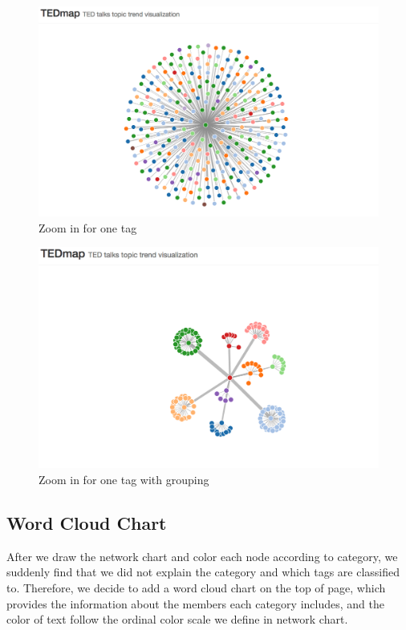 \documentclass{report}
\numberwithin{figure}{section}
\begin{document}
\begin{figure}
\begin{center}
\includegraphics[scale=0.3]{focusOneTag_d1}
\caption{Zoom in for one tag}
\label{fig:zoomin1}
\end{center}
\end{figure}

\begin{figure}
\begin{center}
\includegraphics[scale=0.3]{focusOneTag_d2}
\caption{Zoom in for one tag with grouping}
\label{fig:zoomin2}
\end{center}
\end{figure}


\subsection{Word Cloud Chart}
\quad After we draw the network chart and color each node according to category, we suddenly find that we did not explain the category and which tags are classified to. Therefore, we decide to add a word cloud chart on the top of page, which provides the information about the members each category includes, and the color of text follow the ordinal color scale we define in network chart. 
\end{document}
